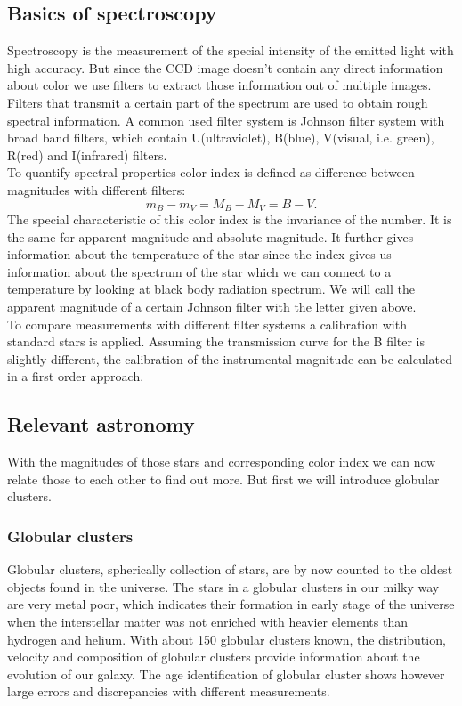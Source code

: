 \subsection{Basics of spectroscopy}
Spectroscopy is the measurement of the special intensity of the emitted light with high accuracy. But since the CCD image doesn't contain any direct information about color we use filters to extract those information out of multiple images. \\
Filters that transmit a certain part of the spectrum are used to obtain rough spectral information. A common used filter system is Johnson filter system with broad band filters, which contain U(ultraviolet), B(blue), V(visual, i.e. green), R(red) and I(infrared) filters.\\
To quantify spectral properties color index is defined as difference between magnitudes with different filters:
\begin{equation}
 m_B-m_V=M_B-M_V=B-V.
\end{equation}
The special characteristic of this color index is the invariance of the number. It is the same for  apparent magnitude and absolute magnitude. It further gives information about the temperature of the star since the index gives us information about the spectrum of the star which we can connect to a temperature by looking at black body radiation spectrum. We will call the apparent magnitude of a certain Johnson filter with the letter given above.\\
To compare measurements with different filter systems a calibration with standard stars is applied. Assuming the transmission curve for the B filter is slightly different, the calibration of the instrumental magnitude can be calculated in a first order approach.
\hspace{4mm}

\subsection{Relevant astronomy}
With the magnitudes of those stars and corresponding color index we can now relate those to each other to find out more. But first we will introduce globular clusters.\\
\subsubsection{Globular clusters}
Globular clusters, spherically collection of stars, are by now counted to the oldest objects found in the universe. The stars in a globular clusters in our milky way are very metal poor, which indicates their formation in early stage of the universe when the interstellar matter was not enriched with heavier elements than hydrogen and helium. With about 150 globular clusters known, the distribution, velocity and composition of globular clusters provide information about the evolution of our galaxy. The age identification of globular cluster shows however large errors and discrepancies with different measurements.
\hspace{2mm}

